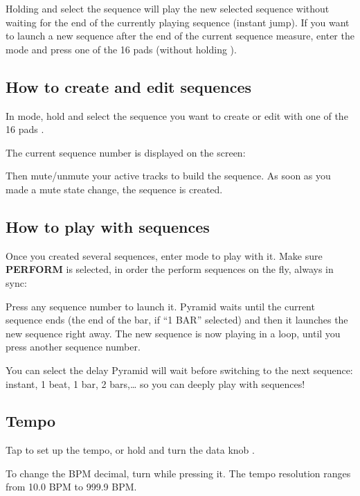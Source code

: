 Holding  and select the sequence will play the new selected sequence without waiting for the end of the currently playing sequence (instant jump). If you want to launch a new sequence after the end of the current sequence measure, enter the  mode and press one of the 16 pads \stepbystepicon{} (without holding ).


\subsection{How to create and edit sequences}

In  mode, hold  and select the sequence you want to create or edit with one of the 16 pads \stepbystepicon{}.

The current sequence number is displayed on the screen:


Then mute/unmute your active tracks to build the sequence. As soon as you made a mute state change, the sequence is created.


\subsection{How to play with sequences}

Once you created several sequences, enter  mode to play with it. Make sure \textbf{PERFORM} is selected, in order the perform sequences on the fly, always in sync:


Press any sequence number \stepbystepicon{} to launch it. Pyramid waits until the current sequence ends (the end of the bar, if ``1 BAR'' selected) and then it launches the new sequence right away. The new sequence is now playing in a loop, until you press another sequence number.

You can select the delay Pyramid will wait before switching to the next sequence: instant, 1 beat, 1 bar, 2 bars,\ldots{} so you can deeply play with sequences!


\subsection{Tempo}

Tap  to set up the tempo, or hold  and turn the data knob \encodericon{}.

To change the BPM decimal, turn \encodericon{} while pressing it. The tempo resolution ranges from 10.0 BPM to 999.9 BPM.


